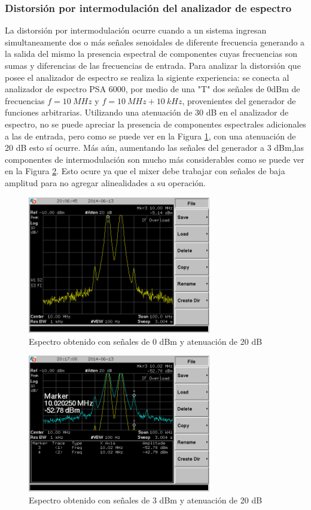\documentclass[a4paper,10pt]{article}
\begin{document}
		\subsubsection{Distorsi\'on por intermodulaci\'on del analizador de 
		espectro}
		La distorsi\'on por intermodulaci\'on ocurre cuando a un sistema ingresan simultaneamente dos o m\'as se\~nales senoidales de diferente frecuencia generando a la salida del mismo la presencia espectral de componentes cuyas frecuencias son sumas y diferencias de las frecuencias de entrada.
		Para analizar la distorsi\'on que posee el analizador de espectro se realiza la sigiente experiencia: se conecta al analizador de espectro PSA 6000, por medio de una "T" dos se\~nales de 0dBm de frecuencias $f=10~MHz$ y $f=10~MHz+10~kHz$, provenientes del generador de funciones arbitrarias. Utilizando una atenuaci\'on de 30 dB en el analizador de espectro, no se puede apreciar la presencia de componentes espectrales adicionales a las de entrada, pero como se puede ver en la Figura \ref{intermod1}, con una atenuaci\'on de 20 dB esto s\'i ocurre. M\'as a\'un, aumentando las se\~nales del generador a 3 dBm,las componentes de intermodulaci\'on son mucho m\'as considerables como se puede ver en la Figura \ref{intermod2}. Esto ocure ya que el mixer debe trabajar con se\~nales de baja amplitud para no agregar alinealidades a su operaci\'on. 
		\begin{figure}[!htb]
				\centering
				\includegraphics[width=8cm]
				{Imagenes/SCREN446.png}
				\caption{Espectro obtenido con se\~nales de 0 dBm y atenuaci\'on de 20 dB}
				\label{intermod1} 
		\end{figure}
				
		\begin{figure}[!htb]
				\centering
				\includegraphics[width=8cm]
				{Imagenes/SCREN447.png}
				\caption{Espectro obtenido con se\~nales de 3 dBm y atenuaci\'on de 20 dB}
				\label{intermod2} 
		\end{figure}
				
\end{document}
